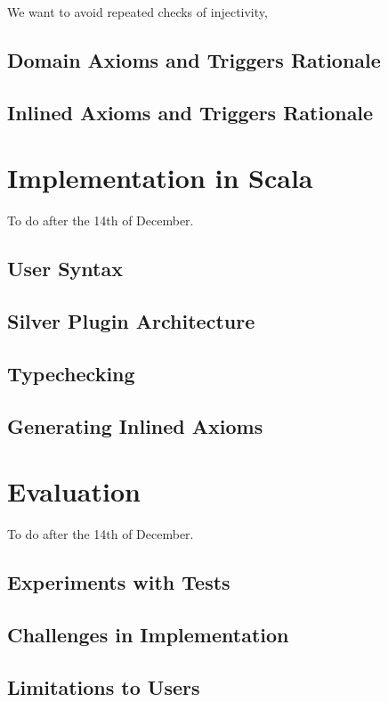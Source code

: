 \documentclass[msc,oneside]{ubcthesis}
\begin{document}
We want to avoid repeated checks of injectivity, 





\section{Domain Axioms and Triggers Rationale}

\section{Inlined Axioms and Triggers Rationale}

\chapter{Implementation in Scala}
To do after the 14th of December. 
\section{User Syntax}

\section{Silver Plugin Architecture}

\section{Typechecking}

\section{Generating Inlined Axioms}

\chapter{Evaluation}
To do after the 14th of December. 

\section{Experiments with Tests}

\section{Challenges in Implementation}

\section{Limitations to Users}
\end{document}
